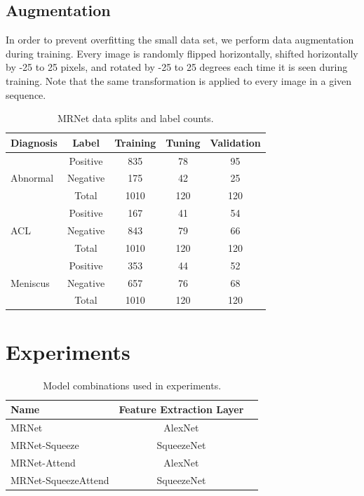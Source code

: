 \documentclass[conference]{IEEEtran}
\begin{document}
\subsection{Augmentation}

In order to prevent overfitting the small data set, we perform data augmentation during training. Every image is randomly flipped horizontally, shifted horizontally by -25 to 25 pixels, and rotated by -25 to 25 degrees each time it is seen during training. Note that the same transformation is applied to every image in a given sequence.

\begin{table}
\begin{center}
\begin{tabular}{|lc|c|c|c|}
\hline
Diagnosis & Label & Training & Tuning & Validation \\
\hline
\multirow{ 3}{*}{Abnormal} & Positive & 835 & 78 & 95 \\
                           & Negative & 175 & 42 & 25 \\
                           & Total & 1010 & 120 & 120 \\
\hline
\multirow{ 3}{*}{ACL}      & Positive & 167 & 41 & 54 \\
                           & Negative & 843 & 79 & 66 \\
                           & Total & 1010 & 120 & 120 \\
\hline
\multirow{ 3}{*}{Meniscus} & Positive & 353 & 44 & 52 \\
                           & Negative & 657 & 76 & 68 \\
                           & Total & 1010 & 120 & 120 \\
\hline
\end{tabular}
\end{center}
\caption{MRNet data splits and label counts.}
\label{tab:dataset}
\end{table}

\section{Experiments} 
\begin{table}
\begin{center}
\begin{tabular}{|l|c|c|}
\hline
Name & Feature Extraction Layer \\
\hline
MRNet & AlexNet \\
MRNet-Squeeze & SqueezeNet \\
MRNet-Attend & AlexNet \\
MRNet-SqueezeAttend & SqueezeNet \\
\hline
\end{tabular}
\end{center}
\caption{Model combinations used in experiments.}
\label{tab:models}
\end{table}
\end{document}
